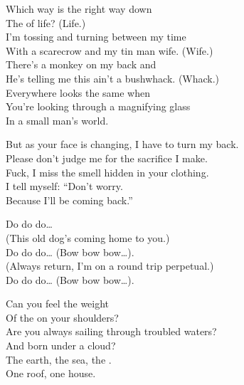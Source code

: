 
Which way is the right way down \\
The  of life? (Life.) \\
I'm tossing and turning between my time \\
With a scarecrow and my tin man wife. (Wife.) \\
There's a monkey on my back and \\
He's telling me this ain't a bushwhack. (Whack.) \\
Everywhere looks the same when \\
You're looking through a magnifying glass \\
In a small man's world. \\


But as your face is changing, I have to turn my back. \\
Please don't judge me for the sacrifice I make. \\
Fuck, I miss the smell hidden in your clothing. \\
I tell myself: ``Don't worry. \\
Because I'll be coming back.'' \\


Do do do… \\
(This old dog's coming home to you.) \\
Do do do… (Bow bow bow…). \\
(Always return, I'm on a round trip perpetual.) \\
Do do do… (Bow bow bow…). \\





Can you feel the weight \\
Of the  on your shoulders? \\
Are you always sailing through troubled waters? \\
And born under a cloud? \\
The earth, the sea, the . \\
One roof, one house. \\

